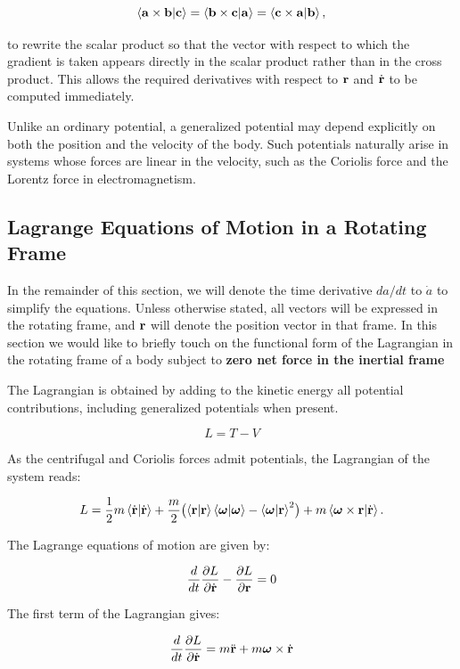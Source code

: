 \documentclass[12pt]{article}
\begin{document}
\[
  \ip{\vb a\times\vb b}{\vb c}
  =
  \ip{\vb b\times\vb c}{\vb a}
  =
  \ip{\vb c\times\vb a}{\vb b},
\]

to rewrite the scalar product so that the vector with respect to which the
gradient is taken appears directly in the scalar product rather than in the
cross product. This allows the required derivatives with respect to
$\vb r$ and $\dot{\vb r}$ to be computed immediately. \par

Unlike an ordinary potential, a generalized potential may depend explicitly on
both the position and the velocity of the body. Such potentials naturally arise
in systems whose forces are linear in the velocity, such as the Coriolis force
and the Lorentz force in electromagnetism.

\subsection{Lagrange Equations of Motion in a Rotating Frame}

In the remainder of this section, we will denote the time derivative $da/dt$ to
$\dot{a}$ to simplify the equations. Unless otherwise stated, all vectors will be expressed in the rotating frame,
and $\vb r$ will denote the position vector in that frame. In this section
we would like to briefly touch on the functional form of the Lagrangian
 in the rotating frame of a body subject to \textbf{zero net force  in the inertial frame}  \par

The Lagrangian is obtained by adding to the kinetic energy all potential contributions, including generalized potentials when present.

\[
  L = T - V
\]

As the centrifugal and Coriolis forces admit potentials,  the Lagrangian of the system reads:

\[
  L = \frac{1}{2}m\ip{\dot{\vb{r}}}{\dot{\vb{r}}}
    +\frac{m}{2}\bigl(
      \ip{\vb{r}}{\vb{r}}\ip{\boldsymbol{\omega}}{\boldsymbol{\omega}}
      - \ip{\boldsymbol{\omega}}{\vb{r}}^2
    \bigr)
    + m\ip{\boldsymbol{\omega}\times\vb{r}}{\dot{\vb{r}}}.
\]

The Lagrange equations of motion are given by:

\[
  \frac{d}{dt}\frac{\partial L}{\partial\dot{\vb{r}}} - \frac{\partial L}{\partial\vb{r}} = 0
\]

The first term of the Lagrangian gives:

\[
  \frac{d}{dt}\frac{\partial L}{\partial\dot{\vb{r}}} = m\ddot{\vb{r}} + m{\boldsymbol \omega} \times \dot{\vb{r}}
\]
\end{document}
